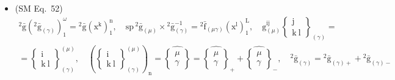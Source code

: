 \documentclass[12pt]{article}
\begin{document}
\begin{itemize}[label={},leftmargin=0pt]
    \item (SM Eq.\ 52) 
    \[
    \begin{gathered}
    {}^2\bar{\mathrm{g}} \left( {}^2\bar{\mathrm{g}}_{(\gamma)} \right)_1^\omega = {}^2\bar{\mathrm{g}}(\mathrm{x^k})_1^\mathrm{n}, \quad \mathrm{sp} \, {}^2\bar{\mathrm{g}}_{(\mu)} \times {}^2\bar{\mathrm{g}}_{(\gamma)}^{-1} = {}^2\bar{\mathrm{f}}_{(\mu\gamma)} (\mathrm{x^l})_1^\mathrm{L}, \quad \mathrm{g}_{(\mu)}^{\mathrm{ij}} \left\{ \begin{smallmatrix} \mathrm{j} \\ \mathrm{k\ l} \end{smallmatrix} \right\}_{(\gamma)} = \\
    = \left\{ \begin{smallmatrix} \mathrm{i} \\ \mathrm{k\ l} \end{smallmatrix} \right\}^{(\mu)}_{(\gamma)}, \quad \left( \left\{ \begin{smallmatrix} \mathrm{i} \\ \mathrm{k\ l} \end{smallmatrix} \right\}^{(\mu)}_{(\gamma)} \right)_\mathrm{n} = \widehat{\left\{ \begin{smallmatrix} \mu \\ \gamma \end{smallmatrix} \right\}} = \widehat{\left\{ \begin{smallmatrix} \mu \\ \gamma \end{smallmatrix} \right\}}_+ + \widehat{\left\{ \begin{smallmatrix} \mu \\ \gamma \end{smallmatrix} \right\}}_-, \quad {}^2\bar{\mathrm{g}}_{(\gamma)} = {}^2\bar{\mathrm{g}}_{(\gamma)+} + {}^2\bar{\mathrm{g}}_{(\gamma)-}
    \end{gathered}
    \]


\end{itemize}
\end{document}
